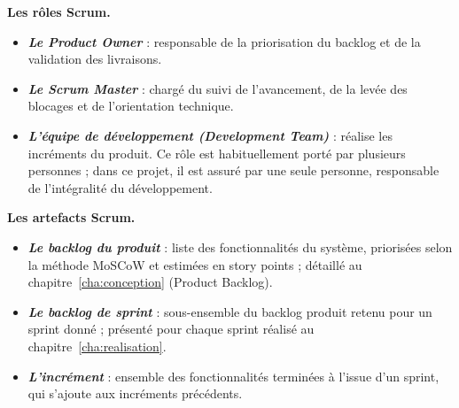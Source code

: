 \textbf{Les rôles Scrum.}

\begin{itemize}[label=•]
    \item \textit{\textbf{Le Product Owner}} : responsable de la priorisation du backlog et de la validation des livraisons.
    \item \textit{\textbf{Le Scrum Master}} : chargé du suivi de l'avancement, de la levée des blocages et de l'orientation technique.
    \item \textit{\textbf{L'équipe de développement (Development Team)}} : réalise les incréments du produit. Ce rôle est habituellement porté par plusieurs personnes ; dans ce projet, il est assuré par une seule personne, responsable de l'intégralité du développement.
\end{itemize}



\textbf{Les artefacts Scrum.}

\begin{itemize}[label=•]
    \item \textit{\textbf{Le backlog du produit}} : liste des fonctionnalités du système, priorisées selon la méthode MoSCoW et estimées en story points ; détaillé au chapitre~\ref{cha:conception} (Product Backlog).
    \item \textit{\textbf{Le backlog de sprint}} : sous-ensemble du backlog produit retenu pour un sprint donné ; présenté pour chaque sprint réalisé au chapitre~\ref{cha:realisation}.
    \item \textit{\textbf{L'incrément}} : ensemble des fonctionnalités terminées à l'issue d'un sprint, qui s'ajoute aux incréments précédents.
\end{itemize}

